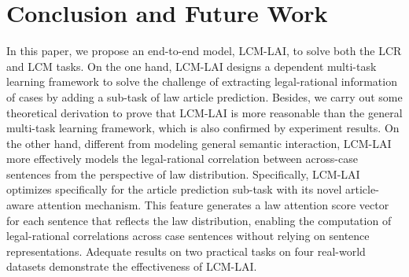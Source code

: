 \section{Conclusion and Future Work} \label{sec:conclusion}
In this paper, we propose an end-to-end model, LCM-LAI, to solve both the LCR and LCM tasks.
On the one hand, LCM-LAI designs a dependent multi-task learning framework to solve the challenge of extracting legal-rational information of cases by adding a sub-task of law article prediction.
Besides, we carry out some theoretical derivation to prove that LCM-LAI is more reasonable than the general multi-task learning framework, which is also confirmed by experiment results.
On the other hand, different from modeling general semantic interaction, LCM-LAI more effectively models the legal-rational correlation between across-case sentences from the perspective of law distribution.
Specifically, LCM-LAI optimizes specifically for the article prediction sub-task with its novel article-aware attention mechanism. 
This feature generates a law attention score vector for each sentence that reflects the law distribution, enabling the computation of legal-rational correlations across case sentences without relying on sentence representations.
Adequate results on two practical tasks on four real-world datasets demonstrate the effectiveness of LCM-LAI.

